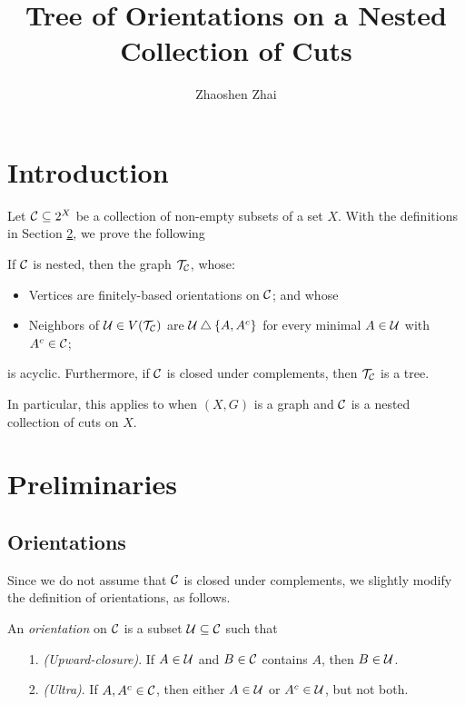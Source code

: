 \documentclass{amsart}
\begin{document}
    \title{Tree of Orientations on a Nested Collection of Cuts}
    \author{Zhaoshen Zhai}
    \maketitle

    \section{Introduction}
    Let $\mathcal{C}\subseteq2^X$ be a collection of non-empty subsets of a set $X$. With the definitions in Section \ref{prelim}, we prove the following
    \begin{theorem}\label{main}
        If $\mathcal{C}$ is nested, then the graph $\mathcal{T}_{\mathcal{C}}$, whose:
        \begin{itemize}
            \item Vertices are finitely-based orientations on $\mathcal{C}$; and whose
            \item Neighbors of $\mathcal{U}\in V(\mathcal{T}_{\mathcal{C}})$ are $\mathcal{U}\bigtriangleup\left\{A,A^c\right\}$ for every minimal $A\in\mathcal{U}$ with $A^c\in\mathcal{C}$;
        \end{itemize}
        is acyclic. Furthermore, if $\mathcal{C}$ is closed under complements, then $\mathcal{T}_{\mathcal{C}}$ is a tree.
    \end{theorem}

    In particular, this applies to when $(X,G)$ is a graph and $\mathcal{C}$ is a nested collection of cuts on $X$.

    \begin{remark}
        
    \end{remark}

    \section{Preliminaries}\label{prelim}

    \subsection{Orientations}

    Since we do not assume that $\mathcal{C}$ is closed under complements, we slightly modify the definition of orientations, as follows.

    \begin{definition}
        An \textit{orientation} on $\mathcal{C}$ is a subset $\mathcal{U}\subseteq\mathcal{C}$ such that
        \begin{enumerate}
            \item[1.] \textit{(Upward-closure)}. If $A\in\mathcal{U}$ and $B\in\mathcal{C}$ contains $A$, then $B\in\mathcal{U}$.
            \item[2.] \textit{(Ultra)}. If $A,A^c\in\mathcal{C}$, then either $A\in\mathcal{U}$ or $A^c\in\mathcal{U}$, but not both.
        \end{enumerate}
    \end{definition}
\end{document}
